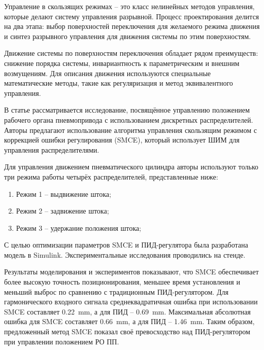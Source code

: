 Управление в скользящих режимах \cite*{utkin2017sliding} -- это класс нелинейных методов управления, которые делают систему управления разрывной.
Процесс проектирования делится на два этапа: выбор поверхностей переключения для желаемого режима движения и синтез разрывного
управления для движения системы по этим поверхностям.

Движение системы по поверхностям переключения обладает рядом преимуществ: снижение порядка системы, инвариантность
к параметрическим и внешним возмущениям. Для описания движения используются специальные математические методы, такие
как регуляризация и метод эквивалентного управления.



В статье \cite*{Elsayed} рассматривается исследование, посвящённое управлению положением рабочего органа пневмопривода
с использованием дискретных распределителей. 
Авторы предлагают использование алгоритма управления скользящим режимом с коррекцией ошибки регулирования (SMCE), который использует
ШИМ для управления распределителями.

Для управления движением пневматического цилиндра авторы используют только три режима работы
четырёх распределителей, представленные ниже:
\begin{enumerate}
    \item Режим 1 -- выдвижение штока;
    \item Режим 2 -- задвижение штока;
    \item Режим 3 -- удержание положения штока;
\end{enumerate}

С целью оптимизации параметров SMCE и ПИД-регулятора была разработана модель в Simulink.
Экспериментальные исследования проводились на стенде.

Результаты моделирования и экспериментов показывают, что SMCE обеспечивает более высокую точность
позиционирования, меньшее время установления и меньший выброс по сравнению с традиционным ПИД-регулятором.
Для гармонического входного сигнала среднеквадратичная ошибка при использовании SMCE составляет \num{0.22}~\si{\milli\metre}, а
для ПИД -- \num{0.69}~\si{\milli\metre}. Максимальная абсолютная ошибка для SMCE составляет \num{0.66}~\si{\milli\metre},
а для ПИД -- \num{1.46}~\si{\milli\metre}. Таким образом,
предложенный метод SMCE показал своё превосходство над ПИД-регулятором при управлении положением РО ПП.

